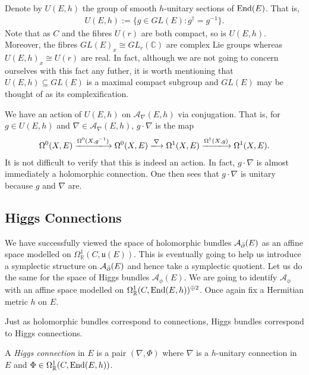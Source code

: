 \documentclass[12pt]{ociamthesis}  %
\begin{document}
Denote by $U(E,h)$ the group of smooth $h$-unitary sections of $\operatorname{End}(E)$.
That is,
\begin{align*}
  U(E,h) := \{g \in GL(E) : g^\dagger = g^{-1}\}.
\end{align*}
Note that as $C$ and the fibres $U(r)$ are both compact,
so is $U(E,h)$. Moreover, the fibres $GL(E)_x \cong GL_r(\mathbb C)$
are complex Lie groups whereas $U(E,h)_x\cong U(r)$ are real.
In fact, although we are not going to concern ourselves with this
fact any futher, it is worth mentioning that $U(E,h)\subseteq GL(E)$
is a maximal compact subgroup and $GL(E)$ may be thought of as its
complexification.

We have an action of $U(E,h)$ on $\mathcal A_\nabla(E,h)$ via conjugation. That is,
for $g\in U(E,h)$ and $\nabla\in \mathcal A_\nabla(E,h)$, $g\cdot\nabla$ is the map
\begin{align*}
  \Omega^0(X,E) \xlongrightarrow{\Omega^0(X,{g}^{-1})}
  \Omega^0(X,E) \xlongrightarrow{\nabla}
  \Omega^1(X,E) \xlongrightarrow{\Omega^1(X,g)}
  \Omega^1(X,E).
\end{align*}
It is not difficult to verify that this is indeed an action.
In fact, $g\cdot\nabla$ is almost immediately a holomorphic connection.
One then sees that $g\cdot\nabla$ is unitary because
$g$ and $\nabla$ are.


\subsection{Higgs Connections}

We have successfully viewed the space of holomorphic bundles $\mathcal A_{\bar{\partial}} (E)$
as an affine space modelled on
$\Omega^1_{\mathbb{R}}(C,\mathfrak{u}(E))$. This is eventually going
to help us introduce a symplectic structure on $\mathcal A_{\bar{\partial}} (E)$ and hence
take a symplectic quotient. Let us do the same for the space of Higgs
bundles $\mathcal A_\phi(E)$. We are going to identify $\mathcal A_\phi$ with an affine
space modelled on $\Omega^1_{\mathbb{R}}(C,\operatorname{End}(E,h))^{\oplus 2}$.
Once again fix a Hermitian metric $h$ on $E$.

Just as holomorphic bundles correspond to connections, Higgs bundles
correspond to Higgs connections.

\begin{definition}
  A \emph{Higgs connection} in $E$ is a pair $(\nabla,\Phi)$
  where $\nabla$ is a $h$-unitary connection in $E$ and
  $\Phi\in\Omega^1_{\mathbb{R}}(C,\operatorname{End}(E,h))$.
\end{definition}
\end{document}
